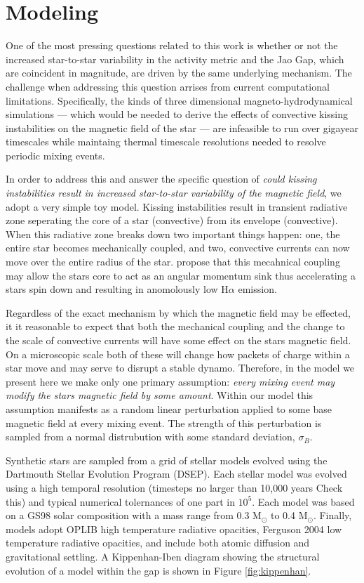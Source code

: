 \section{Modeling}\label{sec:modeling}
One of the most pressing questions related to this work is whether or not the
increased star-to-star variability in the activity metric and the Jao Gap,
which are coincident in magnitude, are driven by the same underlying mechanism.
The challenge when addressing this question arrises from current computational
limitations. Specifically, the kinds of three dimensional
magneto-hydrodynamical simulations --- which would be needed to derive the
effects of convective kissing instabilities on the magnetic field of the star
--- are infeasible to run over gigayear timescales while maintaing thermal
timescale resolutions needed to resolve periodic mixing events.

In order to address this and answer the specific question of \textit{could
kissing instabilities result in increased star-to-star variability of the
magnetic field}, we adopt a very simple toy model. Kissing instabilities result
in transient radiative zone seperating the core of a star (convective) from its
envelope (convective). When this radiative zone breaks down two important
things happen: one, the entire star becomes mechanically coupled, and two,
convective currents can now move over the entire radius of the star.
\citet{Jao2023} propose that this mecahnical coupling may allow the stars core
to act as an angular momentum sink thus accelerating a stars spin down and
resulting in anomolously low H$\alpha$ emission. 

Regardless of the exact mechanism by which the magnetic field may be effected,
it it reasonable to expect that both the mechanical coupling and the change to
the scale of convective currents will have some effect on the stars magnetic
field. On a microscopic scale both of these will change how packets of charge
within a star move and may serve to disrupt a stable dynamo. Therefore, in the
model we present here we make only one primary assumption: \textit{every mixing
event may modify the stars magnetic field by some amount}. Within our model
this assumption manifests as a random linear perturbation applied to some base
magnetic field at every mixing event. The strength of this perturbation is 
sampled from a normal distrubution with some standard deviation, $\sigma_{B}$.

Synthetic stars are sampled from a grid of stellar models evolved using the
Dartmouth Stellar Evolution Program (DSEP). Each stellar model was evolved
using a high temporal resolution (timesteps no larger than 10,000 years
{\color{red} Check this}) and typical numerical tolernances of one part in
$10^5$. Each model was based on a GS98 \citep{Grevesse1998} solar
composition with a mass range from 0.3 M$_{\odot}$ to 0.4 M$_{\odot}$. Finally,
models adopt OPLIB high temperature radiative opacities, Ferguson 2004 low
temperature radiative opacities, and include both atomic diffusion and
gravitational settling. A Kippenhan-Iben diagram showing the structural
evolution of a model within the gap is shown in Figure \ref{fig:kippenhan}.

